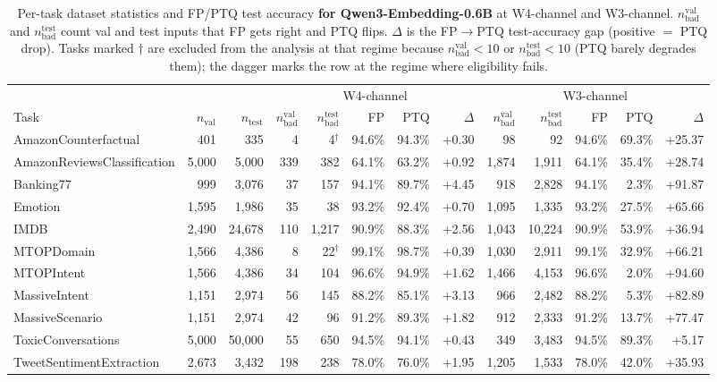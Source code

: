 \begin{table}[t]
\centering
\caption{Per-task dataset statistics and FP/PTQ test accuracy \textbf{for Qwen3-Embedding-0.6B} at W4-channel and W3-channel. $n_{\text{bad}}^{\text{val}}$ and $n_{\text{bad}}^{\text{test}}$ count val and test inputs that FP gets right and PTQ flips. $\Delta$ is the FP$\to$PTQ test-accuracy gap (positive $=$ PTQ drop). Tasks marked $\dagger$ are excluded from the analysis at that regime because $n_{\text{bad}}^{\text{val}} < 10$ or $n_{\text{bad}}^{\text{test}} < 10$ (PTQ barely degrades them); the dagger marks the row at the regime where eligibility fails.}
\label{tab:task_stats_qwen3}
\small
\setlength{\tabcolsep}{4pt}
\begin{tabular}{lrrrrrrrrrrrr}
\toprule
& & & \multicolumn{5}{c}{W4-channel} & \multicolumn{5}{c}{W3-channel} \\
\cmidrule(lr){4-8} \cmidrule(lr){9-13}
Task & $n_{\text{val}}$ & $n_{\text{test}}$ & $n_{\text{bad}}^{\text{val}}$ & $n_{\text{bad}}^{\text{test}}$ & FP & PTQ & $\Delta$ & $n_{\text{bad}}^{\text{val}}$ & $n_{\text{bad}}^{\text{test}}$ & FP & PTQ & $\Delta$ \\
\midrule
AmazonCounterfactual & 401 & 335 & 4 & 4$^{\dagger}$ & 94.6\% & 94.3\% & +0.30 & 98 & 92 & 94.6\% & 69.3\% & +25.37 \\
AmazonReviewsClassification & 5,000 & 5,000 & 339 & 382 & 64.1\% & 63.2\% & +0.92 & 1,874 & 1,911 & 64.1\% & 35.4\% & +28.74 \\
Banking77 & 999 & 3,076 & 37 & 157 & 94.1\% & 89.7\% & +4.45 & 918 & 2,828 & 94.1\% & 2.3\% & +91.87 \\
Emotion & 1,595 & 1,986 & 35 & 38 & 93.2\% & 92.4\% & +0.70 & 1,095 & 1,335 & 93.2\% & 27.5\% & +65.66 \\
IMDB & 2,490 & 24,678 & 110 & 1,217 & 90.9\% & 88.3\% & +2.56 & 1,043 & 10,224 & 90.9\% & 53.9\% & +36.94 \\
MTOPDomain & 1,566 & 4,386 & 8 & 22$^{\dagger}$ & 99.1\% & 98.7\% & +0.39 & 1,030 & 2,911 & 99.1\% & 32.9\% & +66.21 \\
MTOPIntent & 1,566 & 4,386 & 34 & 104 & 96.6\% & 94.9\% & +1.62 & 1,466 & 4,153 & 96.6\% & 2.0\% & +94.60 \\
MassiveIntent & 1,151 & 2,974 & 56 & 145 & 88.2\% & 85.1\% & +3.13 & 966 & 2,482 & 88.2\% & 5.3\% & +82.89 \\
MassiveScenario & 1,151 & 2,974 & 42 & 96 & 91.2\% & 89.3\% & +1.82 & 912 & 2,333 & 91.2\% & 13.7\% & +77.47 \\
ToxicConversations & 5,000 & 50,000 & 55 & 650 & 94.5\% & 94.1\% & +0.43 & 349 & 3,483 & 94.5\% & 89.3\% & +5.17 \\
TweetSentimentExtraction & 2,673 & 3,432 & 198 & 238 & 78.0\% & 76.0\% & +1.95 & 1,205 & 1,533 & 78.0\% & 42.0\% & +35.93 \\
\bottomrule
\end{tabular}
\end{table}
